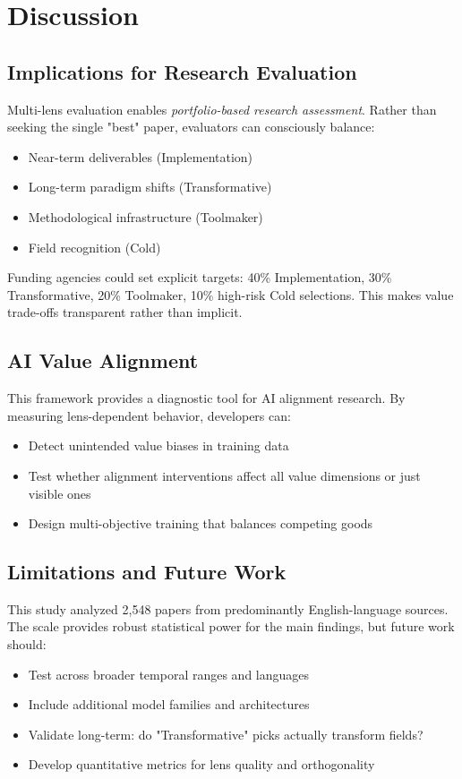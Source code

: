\documentclass{article}
\begin{document}
\section{Discussion}

\subsection{Implications for Research Evaluation}

Multi-lens evaluation enables \textit{portfolio-based research assessment}. Rather than seeking the single "best" paper, evaluators can consciously balance:
\begin{itemize}
    \item Near-term deliverables (Implementation)
    \item Long-term paradigm shifts (Transformative)
    \item Methodological infrastructure (Toolmaker)
    \item Field recognition (Cold)
\end{itemize}

Funding agencies could set explicit targets: 40\% Implementation, 30\% Transformative, 20\% Toolmaker, 10\% high-risk Cold selections. This makes value trade-offs transparent rather than implicit.

\subsection{AI Value Alignment}

This framework provides a diagnostic tool for AI alignment research. By measuring lens-dependent behavior, developers can:
\begin{itemize}
    \item Detect unintended value biases in training data
    \item Test whether alignment interventions affect all value dimensions or just visible ones
    \item Design multi-objective training that balances competing goods
\end{itemize}

\subsection{Limitations and Future Work}

This study analyzed 2,548 papers from predominantly English-language sources. The scale provides robust statistical power for the main findings, but future work should:
\begin{itemize}
    \item Test across broader temporal ranges and languages
    \item Include additional model families and architectures
    \item Validate long-term: do "Transformative" picks actually transform fields?
    \item Develop quantitative metrics for lens quality and orthogonality
\end{itemize}
\end{document}
